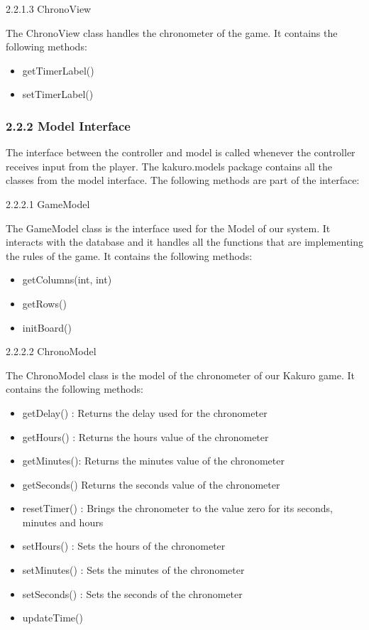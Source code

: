 \documentclass[12pt]{article}
\begin{document}
2.2.1.3 ChronoView\newline

The ChronoView class handles the chronometer of the game. It contains the following methods:\newline
\begin{itemize}
\item getTimerLabel()
\item setTimerLabel()\newline
\end{itemize}


\subsubsection{2.2.2 Model Interface}
The interface between the controller and model is called whenever the controller receives input from the player. The kakuro.models package contains all the classes from the model interface. The following methods are part of the interface:\newline

2.2.2.1 GameModel \newline

The GameModel class is the interface used for the Model of our system. It interacts with the database and it handles all the functions that are implementing the rules of the game. It contains the following methods:\newline
\begin{itemize}
\item getColumns(int, int)
\item getRows()
\item initBoard()\newline
\end{itemize}

2.2.2.2 ChronoModel\newline

The ChronoModel class is the model of the chronometer of our Kakuro game. It contains the following methods:\newline
\begin{itemize}
\item getDelay() : Returns the delay used for the chronometer
\item getHours() : Returns the hours value of the chronometer
\item getMinutes(): Returns the minutes value of the chronometer
\item getSeconds() Returns the seconds value of the chronometer
\item resetTimer() : Brings the chronometer to the value zero for its seconds, minutes and hours
\item setHours() : Sets the hours of the chronometer
\item setMinutes() : Sets the minutes of the chronometer
\item setSeconds() : Sets the seconds of the chronometer
\item updateTime()\newline
\end{itemize}
\end{document}
